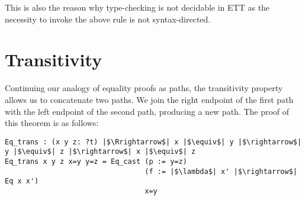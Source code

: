 \documentclass[12pt,twoside,maitrise]{dms}
\theoremstyle{definition}
\numberwithin{equation}{section}
\numberwithin{table}{chapter}
\numberwithin{figure}{chapter}
\begin{document}
\begin{prooftree*}
\end{prooftree*}

This is also the reason why type-checking is not decidable in ETT as the
necessity to invoke the above rule is not syntax-directed.

\section{Transitivity}\label{sec:eqtransitivity}
Continuing our analogy of equality proofs as paths, the transitivity property
allows us to concatenate two paths. We join the right endpoint of the first path
with the left endpoint of the second path, producing a new path. The proof of
this theorem is as follows:

\begin{verbatim}
Eq_trans : (x y z: ?t) |$\Rrightarrow$| x |$\equiv$| y |$\rightarrow$| y |$\equiv$| z |$\rightarrow$| x |$\equiv$| z
Eq_trans x y z x=y y=z = Eq_cast (p := y=z)
                                 (f := |$\lambda$| x' |$\rightarrow$| Eq x x')
                                 x=y
\end{verbatim}
\end{document}
